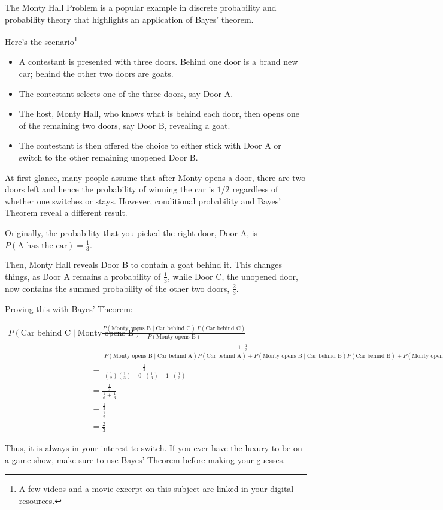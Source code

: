 The Monty Hall Problem is a popular example in discrete probability and probability theory that highlights an application of Bayes' theorem. 

Here's the scenario\footnote{A few videos and a movie excerpt on this subject are linked in your digital resources.}
\begin{itemize}
    \item A contestant is presented with three doors. Behind one door is a brand new car; behind the other two doors are goats.
    \item The contestant selects one of the three doors, say Door A.
    \item The host, Monty Hall, who knows what is behind each door, then opens one of the remaining two doors, say Door B, revealing a goat.
    \item The contestant is then offered the choice to either stick with Door A or switch to the other remaining unopened Door B.
\end{itemize}

At first glance, many people assume that after Monty opens a door, there are two
doors left and hence the probability of winning the car is $1/2$ regardless of
whether one switches or stays. However, conditional probability and Bayes' Theorem reveal a different result.

Originally, the probability that you picked the right door, Door A, is $P(\text{A has the car}) = \frac{1}{3}$. 

Then, Monty Hall reveals Door B to contain a goat behind it. This changes things, as Door A remains a probability of $\frac{1}{3}$, while Door C, the unopened door, now contains the summed probability of the other two doors, $\frac{2}{3}$.

Proving this with Bayes' Theorem:

\begin{align*}
P(\text{Car behind C} \mid \text{Monty opens B}) 
&= \frac{P(\text{Monty opens B} \mid \text{Car behind C}) \, P(\text{Car behind C})}
         {P(\text{Monty opens B})} \\[6pt]
&= \frac{1 \cdot \tfrac{1}{3}}
         {\;P(\text{Monty opens B} \mid \text{Car behind A})P(\text{Car behind A}) 
         + P(\text{Monty opens B} \mid \text{Car behind B})P(\text{Car behind B}) 
         + P(\text{Monty opens B} \mid \text{Car behind C})P(\text{Car behind C})} \\[6pt]
&= \frac{\tfrac{1}{3}}
         {\;(\tfrac{1}{2})(\tfrac{1}{3}) + 0\cdot(\tfrac{1}{3}) + 1\cdot(\tfrac{1}{3})} \\[6pt]
&= \frac{\tfrac{1}{3}}{\tfrac{1}{6} + \tfrac{1}{3}} \\[6pt]
&= \frac{\tfrac{1}{3}}{\tfrac{1}{2}} \\[6pt]
&= \tfrac{2}{3}
\end{align*}

Thus, it is always in your interest to switch. If you ever have the luxury to be on a game show, make sure to use Bayes' Theorem before making your guesses. 